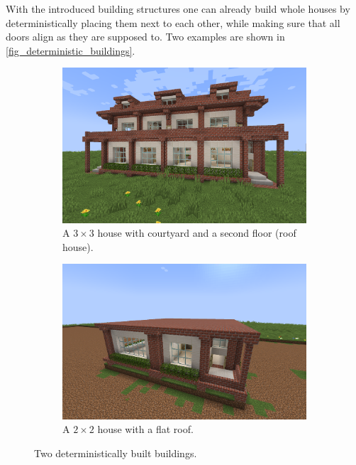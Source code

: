 \documentclass[
oneside,
fontsize=11pt
]{scrartcl}
\begin{document}
With the introduced building structures one can already 
build whole houses by deterministically placing them next to each other, 
while making sure that all doors align as they are supposed to. 
Two examples are shown in \autoref{fig_deterministic_buildings}.

\begin{figure}[ht]
  \centering
  \begin{subfigure}{0.48\textwidth}
    \includegraphics[width=\textwidth]{images/buildings/deterministic-building-with-roofhouse.png}
    \caption{A $3 \times 3$ house with courtyard and a second floor (roof house).}
  \end{subfigure}
  \hfill
  \begin{subfigure}{0.48\textwidth}
      \includegraphics[width=\textwidth]{images/buildings/deterministic-building-with-flat-roof.png}
      \caption{A $2 \times 2$ house with a flat roof.}
  \end{subfigure}
  \caption{Two deterministically built buildings.}
  \label{fig_deterministic_buildings}
\end{figure}
\end{document}
